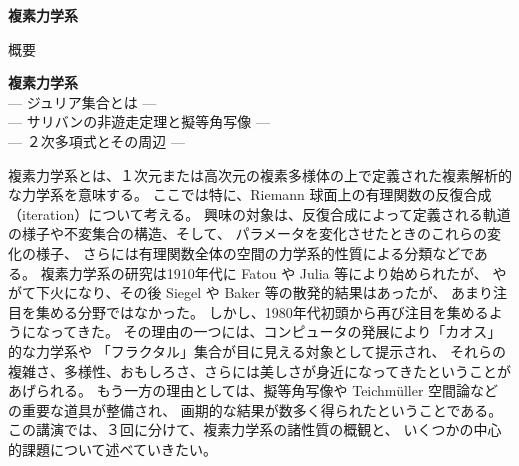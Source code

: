 \documentclass[uplatex,dvipdfmx]{jlreq}
\begin{document}
\begin{center}
  \vspace*{20pt}
  {\Huge\bfseries 複素力学系}

  \vspace{1pc}
  {\Large 概要}
\end{center}

\vfill

\newpage

\noindent
{\large\bfseries 複素力学系}\\
\hspace{2em} --- ジュリア集合とは ---\\
\hspace{2em} --- サリバンの非遊走定理と擬等角写像 ---\\
\hspace{2em} --- ２次多項式とその周辺 ---

\bigskip
\hspace*{\fill}{\large\bfseries 宍倉　光広（京都大学大学院理学研究科）}

\bigskip

複素力学系とは、１次元または高次元の複素多様体の上で定義された複素解析的な力学系を意味する。
ここでは特に、Riemann 球面上の有理関数の反復合成（iteration）について考える。
興味の対象は、反復合成によって定義される軌道の様子や不変集合の構造、そして、
パラメータを変化させたときのこれらの変化の様子、
さらには有理関数全体の空間の力学系的性質による分類などである。
複素力学系の研究は1910年代に Fatou や Julia 等により始められたが、
やがて下火になり、その後 Siegel や Baker 等の散発的結果はあったが、
あまり注目を集める分野ではなかった。
しかし、1980年代初頭から再び注目を集めるようになってきた。
その理由の一つには、コンピュータの発展により「カオス」的な力学系や
「フラクタル」集合が目に見える対象として提示され、
それらの複雑さ、多様性、おもしろさ、さらには美しさが身近になってきたということがあげられる。
もう一方の理由としては、擬等角写像や Teichmüller 空間論などの重要な道具が整備され、
画期的な結果が数多く得られたということである。
この講演では、３回に分けて、複素力学系の諸性質の概観と、
いくつかの中心的課題について述べていきたい。
\end{document}
